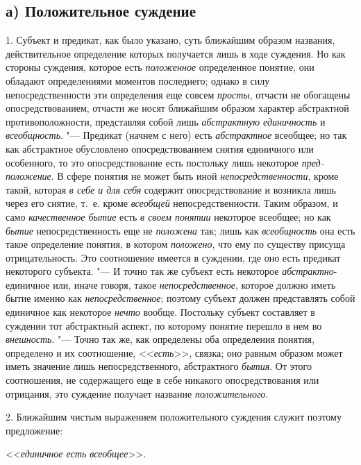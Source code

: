 {\subsection[а) Положительное суждение ]{а) Положительное суждение}
1. Субъект и предикат, как было указано, суть ближайшим
образом названия, действительное определение которых получается лишь в ходе
суждения. Но как стороны суждения, которое есть
{\em положенное}
определенное понятие, они обладают определениями моментов
последнего; однако в силу непосредственности эти определения еще совсем
{\em просты}, отчасти не
обогащены опосредствованием, отчасти же носят ближайшим образом характер
абстрактной противоположности, представляя собой лишь
{\em абстрактную единичность}
и {\em всеобщность}. "---
Предикат (начнем с него) есть
{\em абстрактное}
всеобщее; но так как абстрактное обусловлено
опосредствованием снятия единичного или особенного, то это опосредствование
есть постольку лишь некоторое
{\em пред-положение}. В
сфере понятия не может быть иной
{\em непосредственности},
кроме такой, которая
{\em в себе и для себя}
содержит опосредствование и возникла лишь через его снятие,
т.~е. кроме {\em всеобщей}
непосредственности. Таким образом, и само
{\em качественное бытие}
есть {\em в своем
понятии} некоторое всеобщее; но как
{\em бытие}
непосредственность еще не
{\em положена} так; лишь
как {\em всеобщность} она
есть такое определение понятия, в котором
{\em положено}, что ему
по существу присуща отрицательность. Это соотношение имеется в суждении,
где оно есть предикат некоторого субъекта. "--- И точно так же
субъект есть некоторое
{\em абстрактно}{}-единичное
или, иначе говоря, такое
{\em непосредственное},
которое должно иметь бытие именно как
{\em непосредственное};
поэтому субъект должен представлять собой единичное как
некоторое {\em нечто}
вообще. Постольку субъект составляет в суждении тот
абстрактный аспект, по которому понятие перешло в нем во
{\em внешность}. "--- Точно
так же, как определены оба определения понятия, определено и их
соотношение, <<{\em есть}>>,
связка; оно равным образом может иметь значение лишь
непосредственного, абстрактного
{\em бытия}. От этого
соотношения, не содержащего еще в себе никакого опосредствования или
отрицания, это суждение получает название
{\em положительного}.

2. Ближайшим чистым выражением положительного суждения служит
поэтому предложение:

<<{\em единичное есть всеобщее}>>.

}
